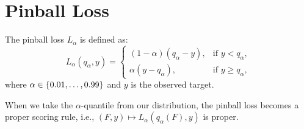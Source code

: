 \section{Pinball Loss}
\label{sec:pinball-loss}

The pinball loss \(L_\alpha\) is defined as: 
\[ L_\alpha(q_\alpha, y) = \begin{cases}
    (1-\alpha)(q_\alpha - y), &\text{if } y < q_\alpha, \\
    \alpha(y - q_\alpha), &\text{if } y \geq q_\alpha,
\end{cases} \]
where \(\alpha \in \{0.01, \ldots, 0.99\}\) and \(y\) is the observed target.

When we take the \(\alpha\)-quantile from our distribution, the pinball loss becomes a proper scoring rule, i.e., \((F, y) \mapsto L_\alpha(q_\alpha(F), y)\) is proper. 